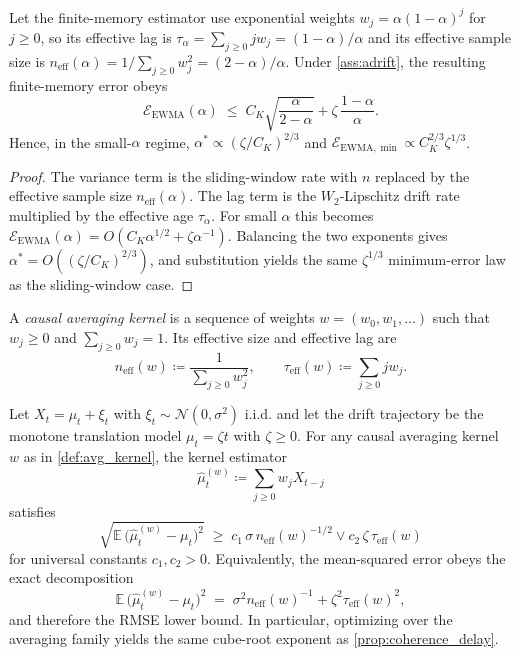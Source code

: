 \begin{corollary}\label{cor:ewma_cube_root}
Let the finite-memory estimator use exponential weights
$w_j = \alpha(1-\alpha)^j$ for $j \geq 0$, so its effective lag is
$\tau_\alpha = \sum_{j\geq 0} j w_j = (1-\alpha)/\alpha$ and its effective
sample size is
$n_{\mathrm{eff}}(\alpha) = 1 / \sum_{j\geq 0} w_j^2 = (2-\alpha)/\alpha$.
Under \cref{ass:adrift}, the resulting finite-memory error obeys
\[
  \mathcal{E}_{\mathrm{EWMA}}(\alpha)
  \;\leq\;
  C_K\sqrt{\frac{\alpha}{2-\alpha}}
  + \zeta\,\frac{1-\alpha}{\alpha}.
\]
Hence, in the small-$\alpha$ regime,
$\alpha^* \propto (\zeta/C_K)^{2/3}$ and
$\mathcal{E}_{\mathrm{EWMA},\min} \propto C_K^{2/3}\zeta^{1/3}$.
\end{corollary}

\begin{proof}
The variance term is the sliding-window rate with $n$ replaced by the effective
sample size $n_{\mathrm{eff}}(\alpha)$. The lag term is the
$W_2$-Lipschitz drift rate multiplied by the effective age
$\tau_\alpha$. For small $\alpha$ this becomes
$\mathcal{E}_{\mathrm{EWMA}}(\alpha)
= O(C_K\alpha^{1/2} + \zeta\alpha^{-1})$.
Balancing the two exponents gives
$\alpha^* = O((\zeta/C_K)^{2/3})$, and substitution yields the same
$\zeta^{1/3}$ minimum-error law as the sliding-window case.
\end{proof}

\begin{definition}\label{def:avg_kernel}
A \emph{causal averaging kernel} is a sequence of weights
$w = (w_0,w_1,\dots)$ such that $w_j \geq 0$ and $\sum_{j\geq 0} w_j = 1$.
Its effective size and effective lag are
\[
  n_{\mathrm{eff}}(w) \coloneqq \frac{1}{\sum_{j\geq 0} w_j^2},
  \qquad
  \tau_{\mathrm{eff}}(w) \coloneqq \sum_{j\geq 0} j w_j.
\]
\end{definition}

\begin{proposition}\label{prop:kernel_lower_bound}
Let $X_t = \mu_t + \xi_t$ with $\xi_t \sim \mathcal{N}(0,\sigma^2)$ i.i.d.
and let the drift trajectory be the monotone translation model
$\mu_t = \zeta t$ with $\zeta \geq 0$. For any causal averaging kernel
$w$ as in \cref{def:avg_kernel}, the kernel estimator
\[
  \hat\mu_t^{(w)} \coloneqq \sum_{j\geq 0} w_j X_{t-j}
\]
satisfies
\[
  \sqrt{\mathbb{E}\,\bigl(\hat\mu_t^{(w)} - \mu_t\bigr)^2}
  \;\geq\;
  c_1\,\sigma\,n_{\mathrm{eff}}(w)^{-1/2}
  \vee
  c_2\,\zeta\,\tau_{\mathrm{eff}}(w)
\]
for universal constants $c_1,c_2>0$.
Equivalently, the mean-squared error obeys the exact decomposition
\[
  \mathbb{E}\,\bigl(\hat\mu_t^{(w)} - \mu_t\bigr)^2
  \;=\;
  \sigma^2 n_{\mathrm{eff}}(w)^{-1} + \zeta^2 \tau_{\mathrm{eff}}(w)^2,
\]
and therefore the RMSE lower bound. In particular, optimizing over the averaging
family yields the same cube-root exponent as \cref{prop:coherence_delay}.
\end{proposition}

